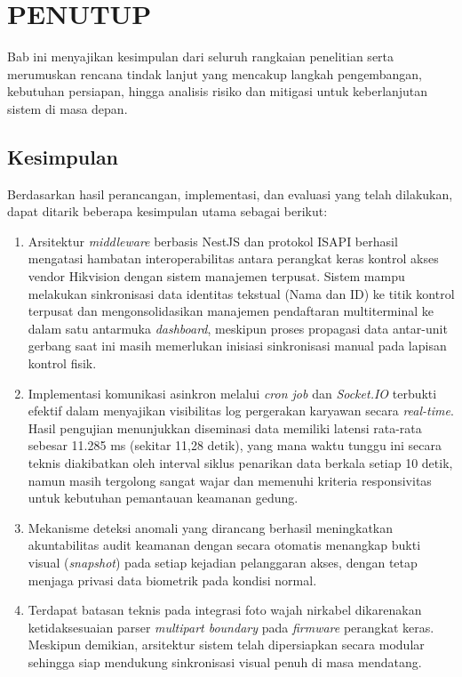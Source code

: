 \cleardoublepage
\chapter{PENUTUP}
\label{chap:penutup}

Bab ini menyajikan kesimpulan dari seluruh rangkaian penelitian serta merumuskan rencana tindak lanjut yang mencakup langkah pengembangan, kebutuhan persiapan, hingga analisis risiko dan mitigasi untuk keberlanjutan sistem di masa depan.

\section{Kesimpulan}
Berdasarkan hasil perancangan, implementasi, dan evaluasi yang telah dilakukan, dapat ditarik beberapa kesimpulan utama sebagai berikut:
\begin{enumerate}
    \item Arsitektur \textit{middleware} berbasis NestJS dan protokol ISAPI berhasil mengatasi hambatan interoperabilitas antara perangkat keras kontrol akses vendor Hikvision dengan sistem manajemen terpusat. Sistem mampu melakukan sinkronisasi data identitas tekstual (Nama dan ID) ke titik kontrol terpusat dan mengonsolidasikan manajemen pendaftaran multiterminal ke dalam satu antarmuka \textit{dashboard}, meskipun proses propagasi data antar-unit gerbang saat ini masih memerlukan inisiasi sinkronisasi manual pada lapisan kontrol fisik.
    \item Implementasi komunikasi asinkron melalui \textit{cron job} dan \textit{Socket.IO} terbukti efektif dalam menyajikan visibilitas log pergerakan karyawan secara \textit{real-time}. Hasil pengujian menunjukkan diseminasi data memiliki latensi rata-rata sebesar 11.285 ms (sekitar 11,28 detik), yang mana waktu tunggu ini secara teknis diakibatkan oleh interval siklus penarikan data berkala setiap 10 detik, namun masih tergolong sangat wajar dan memenuhi kriteria responsivitas untuk kebutuhan pemantauan keamanan gedung.
    \item Mekanisme deteksi anomali yang dirancang berhasil meningkatkan akuntabilitas audit keamanan dengan secara otomatis menangkap bukti visual (\textit{snapshot}) pada setiap kejadian pelanggaran akses, dengan tetap menjaga privasi data biometrik pada kondisi normal.
    \item Terdapat batasan teknis pada integrasi foto wajah nirkabel dikarenakan ketidaksesuaian parser \textit{multipart boundary} pada \textit{firmware} perangkat keras. Meskipun demikian, arsitektur sistem telah dipersiapkan secara modular sehingga siap mendukung sinkronisasi visual penuh di masa mendatang.
\end{enumerate}

